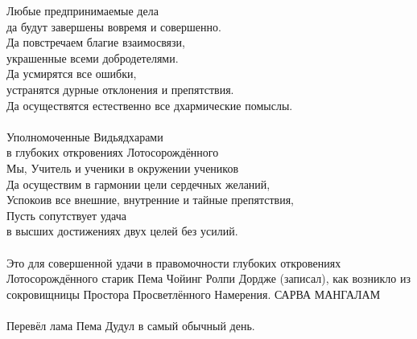Любые предпринимаемые дела \\ \indent да будут завершены вовремя и совершенно.\\
Да повстречаем благие взаимосвязи, \\ \indent украшенные всеми добродетелями. \\
Да усмирятся все ошибки, \\ \indent устранятся дурные отклонения и препятствия.\\
Да осуществятся естественно все дхармические помыслы.\\
\\
Уполномоченные Видьядхарами \\ \indent в глубоких откровениях Лотосорождённого \\
Мы, Учитель и ученики в окружении учеников \\
Да осуществим в гармонии цели сердечных желаний,\\
Успокоив все внешние, внутренние и тайные препятствия,\\
Пусть сопутствует удача \\ \indent в высших достижениях двух целей без усилий.\\
\\
\scriptsize
Это для совершенной удачи в правомочности глубоких откровениях
Лотосорождённого старик Пема Чойинг Ролпи Дордже (записал),
как возникло из сокровищницы Простора Просветлённого Намерения. САРВА МАНГАЛАМ\\
\\
Перевёл лама Пема Дудул в самый обычный день.\normalsize
